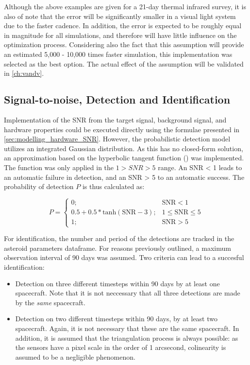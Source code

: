 Although the above examples are given for a 21-day thermal infrared survey, it is also of note that the error will be significantly smaller in a visual light system due to the faster cadence. In addition, the error is expected to be roughly equal in magnitude for all simulations, and therefore will have little influence on the optimization process. Considering also the fact that this assumption will provide an estimated 5,000 - 10,000 times faster simulation, this implementation was selected as the best option. The actual effect of the assumption will be validated in \autoref{ch:vandv}.


\subsection{Signal-to-noise, Detection and Identification}
Implementation of the SNR from the target signal, background signal, and hardware properties could be executed directly using the formulae presented in \autoref{sec:modelling_hardware_SNR}. However, the probabilistic detection model utilizes an integrated Gaussian distribution. As this has no closed-form solution, an approximation based on the hyperbolic tangent function (\cite{GaussianTanh}) was implemented. The function was only applied in the $1 > SNR > 5$ range. An SNR < 1 leads to an automatic failure in detection, and an SNR > 5 to an automatic success. The probability of detection $P$ is thus calculated as:

\begin{equation}
 P = \begin{cases}
      0; &\mathrm{SNR}<1 \\
      0.5 + 0.5*\mathrm{tanh}(\mathrm{SNR}-3); &1 \leq \mathrm{SNR} \leq 5 \\
      1; &\mathrm{SNR}>5
     \end{cases}
\end{equation}


For identification, the number and period of the detections are tracked in the asteroid parameters dataframe. For reasons previously outlined, a maximum observation interval of 90 days was assumed. Two criteria can lead to a succesful identification:
\begin{itemize}
 \item Detection on three different timesteps within 90 days by at least one spacecraft. Note that it is not neccessary that all three detections are made by the \textit{same} spacecraft.
 \item Detection on two different timesteps within 90 days, by at least two spacecraft. Again, it is not necessary that these are the same spacecraft. In addition, it is assumed that the triangulation process is always possible: as the sensors have a pixel scale in the order of 1 arcsecond, colinearity is assumed to be a negligible phenomenon.
\end{itemize}

